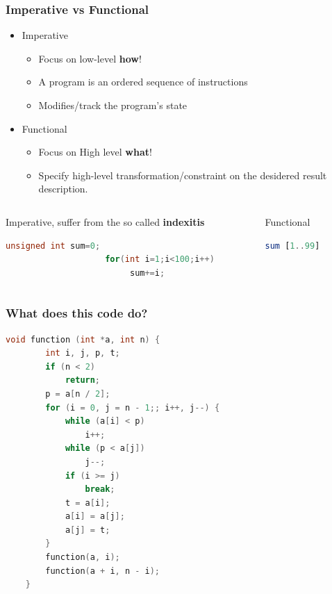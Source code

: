\begin{frame}[fragile]\frametitle{Imperative vs Functional} 
		\begin{itemize}
		\item Imperative
		  \begin{itemize}
		    \item Focus on low-level \textbf{how}!
		    \item A program is an ordered sequence of instructions
		    \item Modifies/track the program's state
		\end{itemize}
	\end{itemize}
	
	\begin{itemize}
		\item Functional
		  \begin{itemize}
		    \item Focus on High level \textbf{what}!
		    \item Specify high-level transformation/constraint on the desidered result
		    description.
		\end{itemize}
	\end{itemize}
	
	\begin{columns}[T] %
			\begin{column}{.7\textwidth}
				\begin{block}{Imperative, suffer from the so called \textbf{indexitis}}
				\begin{lstlisting}[language=c]
					unsigned int sum=0;
					for(int i=1;i<100;i++)
						 sum+=i;
				\end{lstlisting}
				\end{block}

			\end{column}%
				\hfill%
				\begin{column}{.28\textwidth}
				\begin{block}{Functional}
				\begin{lstlisting}[language=haskell]
					sum [1..99]
				\end{lstlisting}
				\end{block}
			\end{column}%
		\end{columns}
	\end{frame}
	
	
\begin{frame}[fragile]\frametitle{What does this code do?} 
\centering
\begin{lstlisting}[language=c,basicstyle=\footnotesize\ttfamily]
	void function (int *a, int n) {
	    int i, j, p, t;
	    if (n < 2)
	        return;
	    p = a[n / 2];
	    for (i = 0, j = n - 1;; i++, j--) {
	        while (a[i] < p)
	            i++;
	        while (p < a[j])
	            j--;
	        if (i >= j)
	            break;
	        t = a[i];
	        a[i] = a[j];
	        a[j] = t;
	    }
	    function(a, i);
	    function(a + i, n - i);
	}
\end{lstlisting}
\end{frame}	

